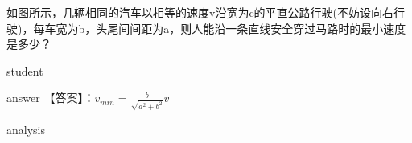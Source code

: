 \begin{example}
	 如图所示，几辆相同的汽车以相等的速度v沿宽为c的平直公路行驶(不妨设向右行驶)，每车宽为b，头尾间间距为a，则人能沿一条直线安全穿过马路时的最小速度是多少？
	
	\begin{taggedblock}{student}
		\vspace*{2cm}
	\end{taggedblock}
	
	
	\begin{taggedblock}{answer}
		【答案】：$ v_{min} = \frac{b}{\sqrt{a^2+b^2}}v $
	\end{taggedblock}
	
	\begin{taggedblock}{analysis}
		

\end{taggedblock}
\end{example}
